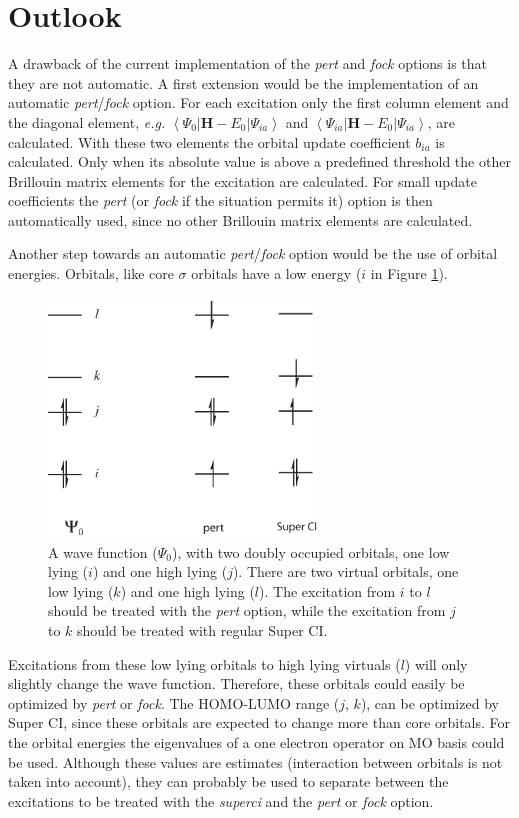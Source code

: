 \section{Outlook}

A drawback of the current implementation of the \textit{pert} and \textit{fock} options is that they are not automatic. A first extension would be the implementation of an automatic \textit{pert}/\textit{fock} option. For each excitation only the first column element and the diagonal element, \textit{e.g.} $\left < \Psi_{0} | \mathbf{H} - E_0 | \Psi_{ia} \right >$ and $\left < \Psi_{ia} | \mathbf{H} - E_0 | \Psi_{ia} \right >$, are calculated. With these two elements the orbital update coefficient $b_{ia}$ is calculated. Only when its absolute value is above a predefined threshold the other Brillouin matrix elements for the excitation are calculated. For small update coefficients the \textit{pert} (or \textit{fock} if the situation permits it) option is then automatically used, since no other Brillouin matrix elements are calculated. 

Another step towards an automatic \textit{pert}/\textit{fock} option would be the use of orbital energies. Orbitals, like core $\sigma$ orbitals have a low energy ($i$ in Figure \ref{ch2.fig.energy}). %
%
\begin{figure}[ht]
\center
\includegraphics[width=2.8in]{orbopt/figures/orbitals.eps}
\caption{A wave function ($\Psi_0$), with two doubly occupied orbitals, one low lying ($i$) and one high lying ($j$). There are two virtual orbitals, one low lying ($k$) and one high lying ($l$). The excitation from $i$ to $l$ should be treated with the \textit{pert} option, while the excitation from $j$ to $k$ should be treated with regular Super CI.}
\label{ch2.fig.energy}
\end{figure} 
Excitations from these low lying orbitals to high lying virtuals ($l$) will only slightly change the wave function. Therefore, these orbitals  could easily be optimized by \textit{pert} or \textit{fock}. The HOMO-LUMO range ($j$, $k$), can be optimized by Super CI, since these orbitals are expected to change more than core orbitals. For the orbital energies the eigenvalues of a one electron operator on MO basis could be used.  Although these values are  estimates (interaction between orbitals is not taken into account), they can probably be used to separate between the excitations to be treated with the \textit{superci} and the \textit{pert} or \textit{fock} option. 

